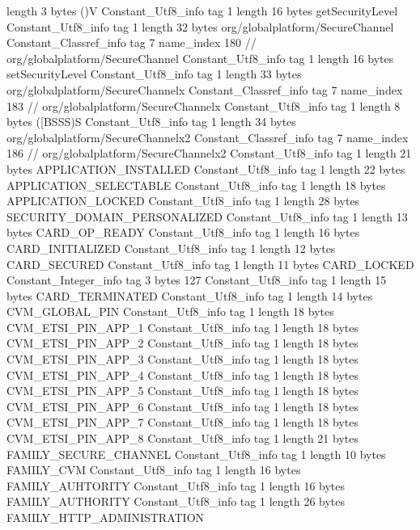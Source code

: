 {{{			length	3
			bytes	()V
		}
		Constant_Utf8_info {
			tag	1
			length	16
			bytes	getSecurityLevel
		}
		Constant_Utf8_info {
			tag	1
			length	32
			bytes	org/globalplatform/SecureChannel
		}
		Constant_Classref_info {
			tag	7
			name_index	180		// org/globalplatform/SecureChannel
		}
		Constant_Utf8_info {
			tag	1
			length	16
			bytes	setSecurityLevel
		}
		Constant_Utf8_info {
			tag	1
			length	33
			bytes	org/globalplatform/SecureChannelx
		}
		Constant_Classref_info {
			tag	7
			name_index	183		// org/globalplatform/SecureChannelx
		}
		Constant_Utf8_info {
			tag	1
			length	8
			bytes	([BSSS)S
		}
		Constant_Utf8_info {
			tag	1
			length	34
			bytes	org/globalplatform/SecureChannelx2
		}
		Constant_Classref_info {
			tag	7
			name_index	186		// org/globalplatform/SecureChannelx2
		}
		Constant_Utf8_info {
			tag	1
			length	21
			bytes	APPLICATION_INSTALLED
		}
		Constant_Utf8_info {
			tag	1
			length	22
			bytes	APPLICATION_SELECTABLE
		}
		Constant_Utf8_info {
			tag	1
			length	18
			bytes	APPLICATION_LOCKED
		}
		Constant_Utf8_info {
			tag	1
			length	28
			bytes	SECURITY_DOMAIN_PERSONALIZED
		}
		Constant_Utf8_info {
			tag	1
			length	13
			bytes	CARD_OP_READY
		}
		Constant_Utf8_info {
			tag	1
			length	16
			bytes	CARD_INITIALIZED
		}
		Constant_Utf8_info {
			tag	1
			length	12
			bytes	CARD_SECURED
		}
		Constant_Utf8_info {
			tag	1
			length	11
			bytes	CARD_LOCKED
		}
		Constant_Integer_info {
			tag	3
			bytes	127
		}
		Constant_Utf8_info {
			tag	1
			length	15
			bytes	CARD_TERMINATED
		}
		Constant_Utf8_info {
			tag	1
			length	14
			bytes	CVM_GLOBAL_PIN
		}
		Constant_Utf8_info {
			tag	1
			length	18
			bytes	CVM_ETSI_PIN_APP_1
		}
		Constant_Utf8_info {
			tag	1
			length	18
			bytes	CVM_ETSI_PIN_APP_2
		}
		Constant_Utf8_info {
			tag	1
			length	18
			bytes	CVM_ETSI_PIN_APP_3
		}
		Constant_Utf8_info {
			tag	1
			length	18
			bytes	CVM_ETSI_PIN_APP_4
		}
		Constant_Utf8_info {
			tag	1
			length	18
			bytes	CVM_ETSI_PIN_APP_5
		}
		Constant_Utf8_info {
			tag	1
			length	18
			bytes	CVM_ETSI_PIN_APP_6
		}
		Constant_Utf8_info {
			tag	1
			length	18
			bytes	CVM_ETSI_PIN_APP_7
		}
		Constant_Utf8_info {
			tag	1
			length	18
			bytes	CVM_ETSI_PIN_APP_8
		}
		Constant_Utf8_info {
			tag	1
			length	21
			bytes	FAMILY_SECURE_CHANNEL
		}
		Constant_Utf8_info {
			tag	1
			length	10
			bytes	FAMILY_CVM
		}
		Constant_Utf8_info {
			tag	1
			length	16
			bytes	FAMILY_AUHTORITY
		}
		Constant_Utf8_info {
			tag	1
			length	16
			bytes	FAMILY_AUTHORITY
		}
		Constant_Utf8_info {
			tag	1
			length	26
			bytes	FAMILY_HTTP_ADMINISTRATION
}}}
